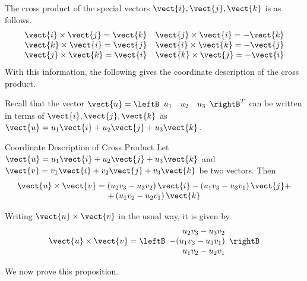 The cross product of the special vectors $\vect{i}, \vect{j},
\vect{k}$ is as follows.  
\begin{equation*}
\begin{array}{cc}
\vect{i}\times \vect{j}=\vect{k} & \vect{j}\times \vect{i}=-\vect{k} \\
\vect{k}\times \vect{i}=\vect{j} & \vect{i}\times \vect{k}=-\vect{j} \\
\vect{j}\times \vect{k}=\vect{i} & \vect{k}\times \vect{j}=-\vect{i}
\end{array}
\end{equation*}
With this information, the following gives the coordinate description of the
cross product.

Recall that the vector $\vect{u}= \leftB 
\begin{array}{ccc}
u_1 & u_2 & u_3
\end{array}
\rightB^T$
can be written in terms of $\vect{i}, \vect{j}, \vect{k}$ as $\vect{u}=u_{1}\vect{i}+u_{2}\vect{j}+u_{3}\vect{k}$. 

\begin{proposition}{Coordinate Description of Cross Product}\label{prop:crossprodcoord}
 Let $\vect{u}=u_{1}\vect{i}+u_{2}\vect{j}+u_{3}\vect{k}$
 and $\vect{v}=v_{1}\vect{i}+v_{2}\vect{j}+v_{3}\vect{k}$ be two
vectors. Then
\begin{equation}
\begin{array}{c}
\vect{u}\times \vect{v} 
 =\left( u_{2}v_{3}-u_{3}v_{2}\right) \vect{i}-\left(
u_{1}v_{3} - u_{3}v_{1}\right) \vect{j}+  \\
 +\left( u_{1}v_{2}-u_{2}v_{1}\right) \vect{k}  \label{crossprod1}
\end{array}
\end{equation}
\end{proposition}

Writing $\vect{u} \times \vect{v}$ in the usual way, it is given by 
\begin{equation*}
\vect{u} \times \vect{v}
=
\leftB
\begin{array}{r}
 u_{2}v_{3}-u_{3}v_{2} \\
-(u_{1}v_{3}-u_{3}v_{1}) \\
 u_{1}v_{2}-u_{2}v_{1}
\end{array}
\rightB
\end{equation*}

We now prove this proposition. 

